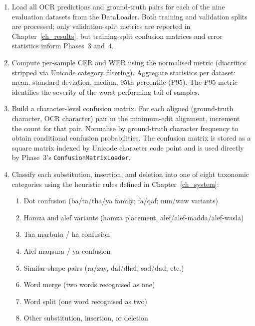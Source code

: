 \begin{enumerate}
  \item Load all OCR predictions and ground-truth pairs for each of the nine
        evaluation datasets from the DataLoader. Both training and validation
        splits are processed; only validation-split metrics are reported in
        Chapter~\ref{ch_results}, but training-split confusion matrices and
        error statistics inform Phases~3 and~4.

  \item Compute per-sample CER and WER using the normalised metric
        (diacritics stripped via Unicode category filtering).
        Aggregate statistics per dataset: mean, standard deviation, median,
        95th percentile (P95). The P95 metric identifies the severity of
        the worst-performing tail of samples.

  \item Build a character-level confusion matrix.
        For each aligned (ground-truth character, OCR character) pair in the
        minimum-edit alignment, increment the count for that pair.
        Normalise by ground-truth character frequency to obtain conditional
        confusion probabilities. The confusion matrix is stored as a
        square matrix indexed by Unicode character code point and is used
        directly by Phase~3's \texttt{ConfusionMatrixLoader}.

  \item Classify each substitution, insertion, and deletion into one of eight
        taxonomic categories using the heuristic rules defined in
        Chapter~\ref{ch_system}:
        \begin{enumerate}
          \item Dot confusion (ba/ta/tha/ya family; fa/qaf; nun/waw variants)
          \item Hamza and alef variants (hamza placement, alef/alef-madda/alef-wasla)
          \item Taa marbuta / ha confusion
          \item Alef maqsura / ya confusion
          \item Similar-shape pairs (ra/zay, dal/dhal, sad/dad, etc.)
          \item Word merge (two words recognised as one)
          \item Word split (one word recognised as two)
          \item Other substitution, insertion, or deletion
        \end{enumerate}


\end{enumerate}
